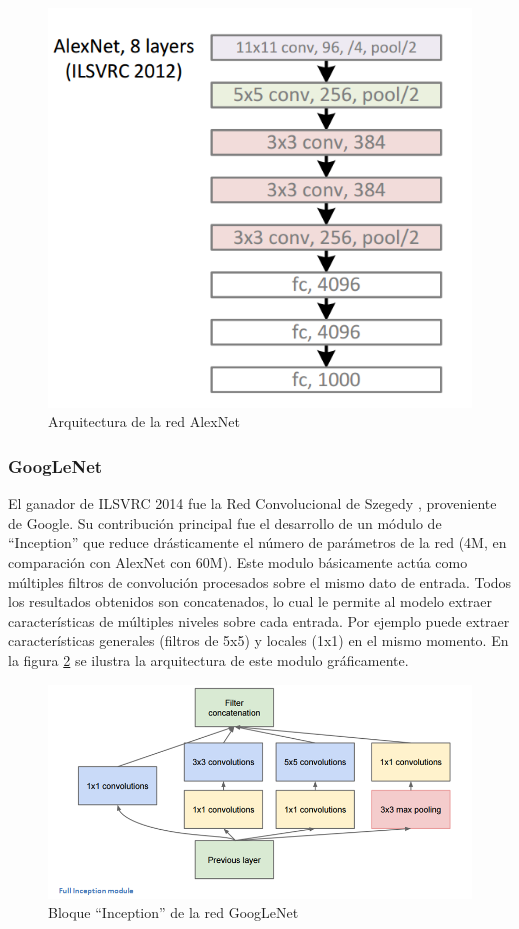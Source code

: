 \documentclass[a4paper,11pt,spanish]{book}
\begin{document}
	  \begin{figure}[h]
	    \begin{center}
	    \includegraphics[width=0.6\linewidth]{./img/alexnet.png}
	    \end{center}
	    \caption{Arquitectura de la red AlexNet}
	    \label{fig:alexnet}
	  \end{figure}	  

	\subsubsection{GoogLeNet}
	  El ganador de ILSVRC 2014 fue la Red Convolucional de Szegedy \cite{Szegedy:Convolutions}, proveniente de Google. Su contribución principal fue el desarrollo de un 
	  módulo de ``Inception'' que reduce drásticamente el número de parámetros de la red (4M, en comparación con AlexNet con 60M). 
	  Este modulo básicamente actúa como múltiples filtros de convolución
	  procesados sobre el mismo dato de entrada. Todos los resultados obtenidos son concatenados, lo cual le permite al modelo extraer características de múltiples niveles sobre
	  cada entrada. Por ejemplo puede extraer características generales (filtros de 5x5) y locales (1x1) en el mismo momento. En la figura \ref{fig:inception} se ilustra la arquitectura
	  de este modulo gráficamente.

	  \begin{figure}[h]
	    \begin{center}
	    \includegraphics[width=0.6\linewidth]{./img/googlenet_inception_module.png}
	    \end{center}
	    \caption{Bloque ``Inception'' de la red GoogLeNet}
	    \label{fig:inception}
	  \end{figure}	  
\end{document}
